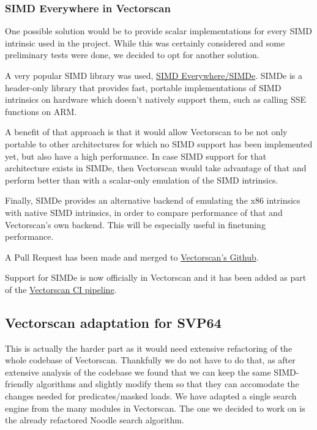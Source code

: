 \subsubsection{SIMD Everywhere in Vectorscan}

One possible solution would be to provide scalar implementations for every SIMD intrinsic used in the project.
While this was certainly considered and some preliminary tests were done, we decided to opt for another solution.

A very popular SIMD library was used, \href{https://github.com/simd-everywhere/simde}{SIMD Everywhere/SIMDe}.
SIMDe is a header-only library that provides fast, portable implementations of SIMD intrinsics on hardware which doesn't natively support them, such as calling SSE functions on ARM.

A benefit of that approach is that it would allow Vectorscan to be not only portable to other architectures for which no SIMD support has been implemented yet, but also have a high performance.
In case SIMD support for that architecture exists in SIMDe, then Vectorscan would take advantage of that and perform better than with a scalar-only emulation of the SIMD intrinsics.

Finally, SIMDe provides an alternative backend of emulating the x86 intrinsics with native SIMD intrinsics, in order to compare performance of that and Vectorscan's own backend. This will be especially useful in finetuning performance.

A Pull Request has been made and merged to \href{https://github.com/VectorCamp/vectorscan/pull/203}{Vectorscan's Github}.

Support for SIMDe is now officially in Vectorscan and it has been added as part of the \href{https://buildbot-ci.vectorcamp.gr/#/grid}{Vectorscan CI pipeline}.

\subsection{Vectorscan adaptation for SVP64}

This is actually the harder part as it would need extensive refactoring of the whole codebase of Vectorscan. Thankfully we do not have to do that, as after extensive analysis of the codebase we found that we can keep the same SIMD-friendly algorithms
and slightly modify them so that they can accomodate the changes needed for predicates/masked loads. We have adapted a single search engine from the many modules in Vectorscan. The one we decided to work on is the already refactored Noodle search algorithm.

